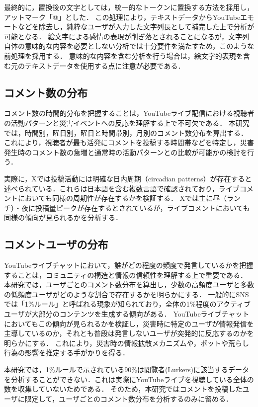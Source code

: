   最終的に，置換後の文字としては，統一的なトークンに置換する方法を採用し，アットマーク「@」とした．
  この処理により，テキストデータからYouTubeエモートなどを除去し，純粋なユーザが入力した文字列長として補完した上で分析が可能となる．
  絵文字による感情の表現が削ぎ落とされることになるが，文字列自体の意味的な内容を必要としない分析では十分要件を満たすため，このような前処理を採用する．
  意味的な内容を含む分析を行う場合は，絵文字的表現を含む元のテキストデータを使用する点に注意が必要である．

  \subsection{コメント数の分布}
  
  コメント数の時間的分布を把握することは，YouTubeライブ配信における視聴者の活動パターンと災害イベントへの反応を理解する上で不可欠である．
  本研究では，時間別，曜日別，曜日と時間帯別，月別のコメント数分布を算出する．
  これにより，視聴者が最も活発にコメントを投稿する時間帯などを特定し，災害発生時のコメント数の急増と通常時の活動パターンとの比較が可能かの検討を行う．

  実際に，Xでは投稿活動には明確な日内周期（circadian patterns）が存在すると述べられている\cite{tenThij2014circadian}．これらは日本語を含む複数言語で確認されており，ライブコメントにおいても同様の周期性が存在するかを検証する．
  Xでは主に昼（ランチ）・夜に投稿量ピークが存在するとされているが，ライブコメントにおいても同様の傾向が見られるかを分析する．

  \subsection{コメントユーザの分布}
  
  YouTubeライブチャットにおいて，誰がどの程度の頻度で発言しているかを把握することは，コミュニティの構造と情報の信頼性を理解する上で重要である．
  本研究では，ユーザごとのコメント数分布を算出し，少数の高頻度ユーザと多数の低頻度ユーザがどのような割合で存在するかを明らかにする．
  一般的にSNSでは「1\%ルール」\cite{nielsen2006, vanmierlo2014}と呼ばれる現象が知られており，全体の1\%程度のアクティブユーザが大部分のコンテンツを生成する傾向がある．
  YouTubeライブチャットにおいてもこの傾向が見られるかを検証し，災害時に特定のユーザが情報発信を主導しているのか，それとも普段は発言しないユーザが突発的に反応するのかを明らかにする．
  これにより，災害時の情報拡散メカニズムや，ボットや荒らし行為の影響を推定する手がかりを得る．
  
  本研究では，1\%ルールで示されている90\%は閲覧者(Lurkers)に該当するデータを分析することができない．これは実際にYouTubeライブを視聴している全体の数を収集していないためである．
  そのため，本研究ではコメントを投稿したユーザに限定して，ユーザごとのコメント数分布を分析するのみに留める．


